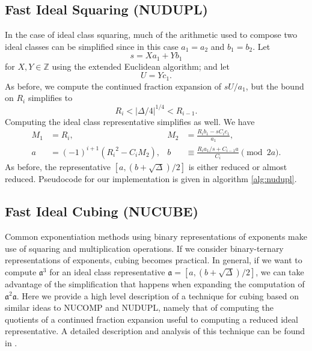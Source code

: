 \documentclass{ucalgthes1}
\theoremstyle{plain}
\theoremstyle{definition}
\newcommand{\ZZ}{\mathbb{Z}}
\begin{document}
\subsection{Fast Ideal Squaring (NUDUPL)}\label{subsec:nudupl}

In the case of ideal class squaring, much of the arithmetic used to compose two ideal classes can be simplified since in this case $a_1=a_2$ and $b_1=b_2$.  Let 
\[
	s = Xa_1 + Yb_1
\]
for $X,Y \in \ZZ$ using the extended Euclidean algorithm; and let 
\[
	U = Yc_1.
\]
As before, we compute the continued fraction expansion of $sU/a_1$, but the bound on $R_i$ simplifies to
\[
	R_i < |\Delta/4|^{1/4} < R_{i-1}.
\]
Computing the ideal class representative simplifies as well.  We have
\begin{align*}
	M_1 &= R_i, & 
	M_2 &= \frac{R_i b_1 - sC_i c_1}{a_1}, \\
	a &= (-1)^{i+1}({R_i}^2 - C_i M_2), &
	b &\equiv \frac{R_i a_1/s  + C_{i-1} a}{C_i} \pmod{2a}.
\end{align*}
As before, the representative $[a, (b+\sqrt\Delta)/2]$ is either reduced or almost reduced.  \break Pseudocode for our implementation is given in algorithm \ref{alg:nudupl}.


\subsection{Fast Ideal Cubing (NUCUBE)}\label{subsec:nucube}

Common exponentiation methods using binary representations of exponents make use of squaring and multiplication operations.  If we consider binary-ternary representations of exponents, cubing becomes practical.  In general, if we want to compute ${\mathfrak a}^3$ for an ideal class representative $\mathfrak a = [a, (b+\sqrt\Delta)/2]$, we can take advantage of the simplification that happens when expanding the computation of ${\mathfrak a}^2 \mathfrak a$.  Here we provide a high level description of a technique for cubing based on similar ideas to NUCOMP and NUDUPL, namely that of computing the quotients of a continued fraction expansion useful to computing a reduced ideal representative.  A detailed description and analysis of this technique can be found in \cite{Ijs2010}.
\end{document}
